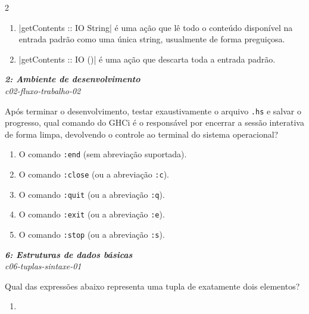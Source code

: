 \documentclass[a4paper,10pt,brazil]{article}
\begin{document}
\begin{multicols}{2}
\begin{enumerate}
  \item \haskellinline|getContents :: IO String| é uma ação que lê todo o conteúdo disponível na entrada padrão como uma única string, usualmente de forma preguiçosa.

  \item \haskellinline|getContents :: IO ()| é uma ação que descarta toda a entrada padrão.


\end{enumerate}

\begin{flushright}
  \footnotesize
  \textit{\textbf{2: Ambiente de desenvolvimento}}\\
  \textit{c02-fluxo-trabalho-02}\\

\end{flushright}
Após terminar o desenvolvimento, testar exaustivamente o arquivo \texttt{.hs} e salvar o progresso, qual comando do GHCi é o responsável por encerrar a sessão interativa de forma limpa, devolvendo o controle ao terminal do sistema operacional?

\begin{enumerate}
  \item O comando \texttt{:end} (sem abreviação suportada).

  \item O comando \texttt{:close} (ou a abreviação \texttt{:c}).

  \item O comando \texttt{:quit} (ou a abreviação \texttt{:q}).

  \item O comando \texttt{:exit} (ou a abreviação \texttt{:e}).

  \item O comando \texttt{:stop} (ou a abreviação \texttt{:s}).


\end{enumerate}

\begin{flushright}
  \footnotesize
  \textit{\textbf{6: Estruturas de dados básicas}}\\
  \textit{c06-tuplas-sintaxe-01}\\

\end{flushright}
Qual das expressões abaixo representa uma tupla de exatamente dois elementos?

\begin{enumerate}
  \item \haskellinline{[42, "ok"]}


\end{enumerate}
\end{multicols}
\end{document}
